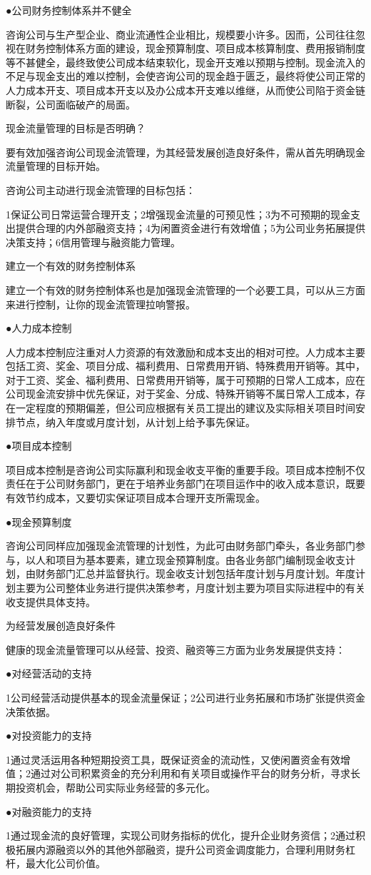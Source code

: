     ●公司财务控制体系并不健全

    咨询公司与生产型企业、商业流通性企业相比，规模要小许多。因而，公司往往忽视在财务控制体系方面的建设，现金预算制度、项目成本核算制度、费用报销制度等不甚健全，最终致使公司成本结束软化，现金开支难以预期与控制。现金流入的不足与现金支出的难以控制，会使咨询公司的现金趋于匮乏，最终将使公司正常的人力成本开支、项目成本开支以及办公成本开支难以维继，从而使公司陷于资金链断裂，公司面临破产的局面。

    现金流量管理的目标是否明确？

    要有效加强咨询公司现金流管理，为其经营发展创造良好条件，需从首先明确现金流量管理的目标开始。

    咨询公司主动进行现金流管理的目标包括：

    1保证公司日常运营合理开支；2增强现金流量的可预见性；3为不可预期的现金支出提供合理的内外部融资支持；4为闲置资金进行有效增值；5为公司业务拓展提供决策支持；6信用管理与融资能力管理。

    建立一个有效的财务控制体系

    建立一个有效的财务控制体系也是加强现金流管理的一个必要工具，可以从三方面来进行控制，让你的现金流管理拉响警报。

    ●人力成本控制

    人力成本控制应注重对人力资源的有效激励和成本支出的相对可控。人力成本主要包括工资、奖金、项目分成、福利费用、日常费用开销、特殊费用开销等。其中，对于工资、奖金、福利费用、日常费用开销等，属于可预期的日常人工成本，应在公司现金流安排中优先保证，对于奖金、分成、特殊开销等不属日常人工成本，存在一定程度的预期偏差，但公司应根据有关员工提出的建议及实际相关项目时间安排节点，纳入年度或月度计划，从计划上给予事先保证。

    ●项目成本控制

    项目成本控制是咨询公司实际赢利和现金收支平衡的重要手段。项目成本控制不仅责任在于公司财务部门，更在于培养业务部门在项目运作中的收入成本意识，既要有效节约成本，又要切实保证项目成本合理开支所需现金。

    ●现金预算制度

    咨询公司同样应加强现金流管理的计划性，为此可由财务部门牵头，各业务部门参与，以人和项目为基本要素，建立现金预算制度。由各业务部门编制现金收支计划，由财务部门汇总并监督执行。现金收支计划包括年度计划与月度计划。年度计划主要为公司整体业务进行提供决策参考，月度计划主要为项目实际进程中的有关收支提供具体支持。

    为经营发展创造良好条件

    健康的现金流量管理可以从经营、投资、融资等三方面为业务发展提供支持：

    ●对经营活动的支持

    1公司经营活动提供基本的现金流量保证；2公司进行业务拓展和市场扩张提供资金决策依据。

    ●对投资能力的支持

    1通过灵活运用各种短期投资工具，既保证资金的流动性，又使闲置资金有效增值；2通过对公司积累资金的充分利用和有关项目或操作平台的财务分析，寻求长期投资机会，帮助公司实际业务经营的多元化。

    ●对融资能力的支持

    1通过现金流的良好管理，实现公司财务指标的优化，提升企业财务资信；2通过积极拓展内源融资以外的其他外部融资，提升公司资金调度能力，合理利用财务杠杆，最大化公司价值。
